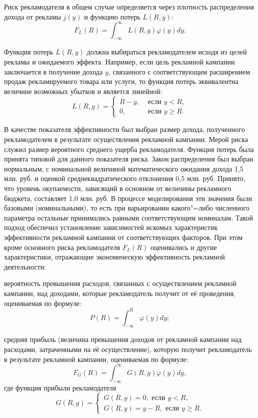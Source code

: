 Риск рекламодателя в общем случае определяется
через плотность распределения дохода от рекламы $j(y)$ и
функцию потерь $L(R, y)$:
$$
	F_{L}(R)=\int_{-\infty}^{\infty} L(R, y) \varphi(y) d y
	.
$$





{Функция потерь $L(R, y)$ должна
выбираться рекламодателем исходя из целей
рекламы и ожидаемого эффекта. Например, если
цель рекламной кампании заключается в получение
дохода $y$, связанного с соответствующим
расширением продаж рекламируемого товара или
услуги, то функция потерь эквивалентна величине
возможных убытков и является линейной:}
$$
	L(R,y) =
	\begin{cases}
		R - y, &\mbox{~если~} y < R,
		\\
		0, &\mbox{~если~} y \geqslant R
		.
	\end{cases}
$$


{В качестве показателя эффективности был
выбран размер дохода, полученного рекламодателем
в результате осуществления рекламной кампании.
Мерой риска служил размер вероятного среднего
ущерба рекламодателя. Функция потерь была принята
типовой для данного показателя риска. Закон
распределения был выбран нормальным, с номинальной
величиной математического ожидания дохода
1,5 млн. руб. и оценкой среднеквадратического
отклонения 0,5 млн. руб. Принято, что
уровень окупаемости, зависящий в основном от
величины рекламного бюджета, составляет 1,0
 млн. руб. В процессе моделирования эти
значения были базовыми (номинальными), то есть
при варьировании какого"=либо численного параметра
остальные принимались равными соответствующим
номиналам. Такой подход обеспечил установление
зависимостей искомых характеристик эффективности
рекламной кампании от соответствующих факторов.
При этом кроме основного риска рекламодателя $F_L(R)$ оценивались
и другие характеристики, отражающие экономическую
эффективность рекламной деятельности:}


{вероятность превышения расходов, связанных
с осуществлением рекламной кампании, над доходами,
которые рекламодатель получит от её проведения,
оцениваемая по формуле:}
$$
	P(R)=\int_{-\infty}^{R} \varphi(y) d y
	;
$$

{средняя прибыль (величина превышения доходов
от рекламной кампании над расходами, затраченными
на её осуществление), которую получит рекламодатель
в результате рекламной кампании, оцениваемая
по формуле:}
$$
	{F}_{G}({R})=\int_{-\infty}^{\infty} {G}({R}, {y}) {\varphi}({y}) d y
	,
$$
где функция прибыли рекламодателя
$$
	G(R, y) =
	\begin{cases}
		G(R,y) = 0, \mbox{~если~} y < R,
		\\
		G(R,y) = y - R, \mbox{~если~} y \geqslant R
		.
	\end{cases}
$$



